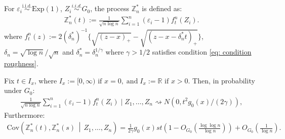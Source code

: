     \begin{lemma}\label{lemma: result with cov structure}
        For \( \varepsilon_i \overset{\text{i.i.d.}}{\sim} \text{Exp}(1) \), $Z_i \stackrel{i.i.d.}{\sim} G_0$, the process $\mathbb{Z}^*_n$ is defined as:
        \begin{align}\label{supp:eq: mathbbZ process}
            \mathbb{Z}^*_n (t) := \frac{1}{\sqrt{n \log n}} \sum_{i=1}^n \left( \varepsilon_i - 1 \right) f_t^n(Z_i).
        \end{align}
        where $f_t^n(z) := 2(\delta_n^*)^{-1} \big\{ \sqrt{(z-x)_+} -\sqrt{(z-x-\delta^*_n t)_+}  \big\}$, $\delta_n = \sqrt{\log{n}}/\sqrt{n}$ and $\delta_n^{*}=\delta_n^{1 / \gamma}$ where $\gamma >1 / 2$ satisfies condition \eqref{eq: condition roughness}.
        
        Fix $t \in I_x$, where $I_x := [0, \infty) \text{ if } x = 0, \; \text{and} \; I_x := \mathbb{R} \text{ if } x > 0$. Then, in probability under $G_0$:
        \begin{align}\label{supp:eq: weak conv for IIP}
            \frac{1}{\sqrt{n \log n}} \sum_{i=1}^n \left( \varepsilon_i - 1 \right) f_t^n(Z_i) \mid Z_1, \ldots, Z_n \rightsquigarrow N\left(0, t^2  g_0(x)/ (2 \gamma) \right),
        \end{align}
        Furthermore:
        \begin{align}\label{supp:eq: cov structure}
            \text{Cov}\left(\mathbb{Z}_n^\ast(t), \mathbb{Z}_n^\ast(s) \,\middle|\, Z_1, \dots, Z_n\right) 
            = \frac{1}{2 \gamma} g_0(x) st \left( 1 - O_{\scriptscriptstyle{G_0}}\left(\frac{\log \log n}{\log n} \right) \right) + O_{\scriptscriptstyle{G_0}}\left(\frac{1}{\log n}\right).
        \end{align}
    \end{lemma}

